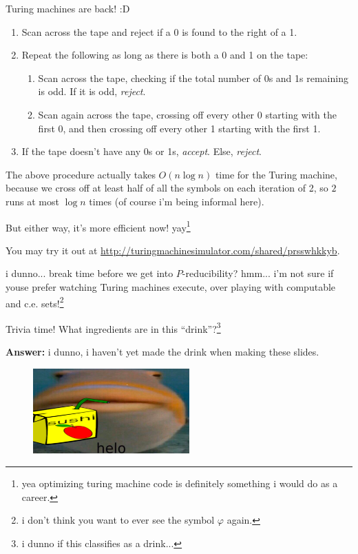 \documentclass{beamer}
\begin{document}
\begin{frame}{Turing machines are back! :D}
\begin{enumerate}
\item Scan across the tape and reject if a 0 is found to the right of a 1.
\item Repeat the following as long as there is both a 0 and 1 on the tape:
\begin{enumerate}
\item Scan across the tape, checking if the total number of 0s and 1s remaining is odd. If it is odd, \textit{reject}.
\item Scan again across the tape, crossing off every other 0 starting with the first 0, and then crossing off every other 1 starting with the first 1.
\end{enumerate}
\item If the tape doesn't have any 0s or 1s, \textit{accept}. Else, \textit{reject}.
\end{enumerate}
The above procedure actually takes $O(n \log n)$ time for the Turing machine, because we cross off at least half of all the symbols on each iteration of 2, so $2$ runs at most $\log n$ times (of course i'm being informal here).

But either way, it's more efficient now! yay\footnote{yea optimizing turing machine code is definitely something i would do as a career.}

\vspace{2mm}

You may try it out at \url{http://turingmachinesimulator.com/shared/prsswhkkyb}.

\end{frame}

\begin{frame}{i dunno... break time before we get into $P$-reducibility?}
hmm... i'm not sure if youse prefer watching Turing machines execute, over playing with computable and c.e. sets!\footnote{i don't think you want to ever see the symbol $\varphi$ again.}

\begin{block}{Trivia time!}
What ingredients are in this ``drink''?\footnote{i dunno if this classifies as a drink...}

\pause

\textbf{Answer:} i dunno, i haven't yet made the drink when making these slides.
\end{block}

\begin{figure}[h]
\centering
\includegraphics[width=6cm]{img/helo_fish_sushi.jpg}
\end{figure}

 
\end{frame}
\end{document}
